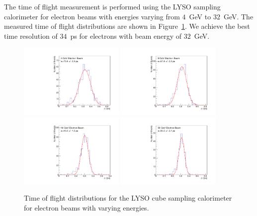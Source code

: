 \documentclass[12pt]{article}
\begin{document}
The time of flight measurement is performed using the LYSO sampling calorimeter
for electron beams with energies varying from $4$~GeV to $32$~GeV. The 
measured time of flight distributions are shown in Figure~\ref{fig:LYSOCubeTOF}.
We achieve the best time resolution of $34$~ps for electrons
with beam energy of $32$~GeV.

\begin{figure}[H] \centering
\includegraphics[width=0.45\textwidth]{figs/TOF_Electron_LYSOCube_4GeV} 
\includegraphics[width=0.45\textwidth]{figs/TOF_Electron_LYSOCube_8GeV} 
\includegraphics[width=0.45\textwidth]{figs/TOF_Electron_LYSOCube_16GeV} 
\includegraphics[width=0.45\textwidth]{figs/TOF_Electron_LYSOCube_32GeV} 
\caption{ Time of flight distributions for the LYSO cube sampling calorimeter
for electron beams with varying energies. } 
\label{fig:LYSOCubeTOF}
\end{figure}
\end{document}
